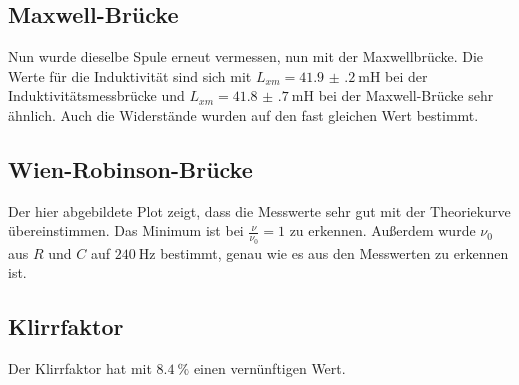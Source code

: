\subsection{Maxwell-Brücke}

Nun wurde dieselbe Spule erneut vermessen, nun mit der Maxwellbrücke. Die Werte für
die Induktivität sind sich mit $L_{xm} = \SI{41.9(2)}{\milli\henry}$ bei der
Induktivitätsmessbrücke und $L_{xm} = \SI{41.8(7)}{\milli\henry}$  bei der
Maxwell-Brücke sehr ähnlich. Auch die Widerstände wurden auf den fast gleichen Wert
bestimmt.

\subsection{Wien-Robinson-Brücke}

Der hier abgebildete Plot zeigt, dass die Messwerte sehr gut mit der Theoriekurve
übereinstimmen. Das Minimum ist bei $\frac{\nu}{\nu_0} = 1$ zu erkennen.
Außerdem wurde $\nu_0$ aus $R$ und $C$ auf $\SI{240}{\hertz}$ bestimmt, genau wie
es aus den Messwerten zu erkennen ist.

\subsection{Klirrfaktor}

Der Klirrfaktor hat mit $\SI{8.4}{\percent}$ einen vernünftigen Wert.
